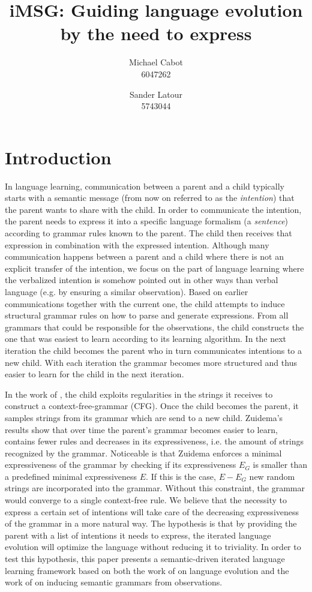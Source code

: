\documentclass[a4paper]{article}
\title{iMSG: Guiding language evolution by the need to express}
\author{Michael Cabot\\6047262 \and Sander Latour\\5743044}
\begin{document}
\maketitle
\section{Introduction}
In language learning, communication between a parent and a child typically starts with a semantic message (from now on referred to as the \emph{intention}) that the parent wants to share with the child. In order to communicate the intention, the parent needs to express it into a specific language formalism (a \emph{sentence}) according to grammar rules known to the parent. The child then receives that expression in combination with the expressed intention. Although many communication happens between a parent and a child where there is not an explicit transfer of the intention, we focus on the part of language learning where the verbalized intention is somehow pointed out in other ways than verbal language (e.g. by ensuring a similar observation). Based on earlier communications together with the current one, the child attempts to induce structural grammar rules on how to parse and generate expressions. From all grammars that could be responsible for the observations, the child constructs the one that was easiest to learn according to its learning algorithm.  In the next iteration the child becomes the parent who in turn communicates intentions to a new child. With each iteration the grammar becomes more structured and thus easier to learn for the child in the next iteration. 

In the work of \cite{zuidema2003poverty}, the child exploits regularities in the strings it receives to construct a context-free-grammar (CFG). Once the child becomes the parent, it samples strings from its grammar which are send to a new child. Zuidema's results show that over time the parent's grammar becomes easier to learn, contains fewer rules and decreases in its expressiveness, i.e. the amount of strings recognized by the grammar. Noticeable is that Zuidema enforces a minimal expressiveness of the grammar by checking if its expressiveness $E_G$ is smaller than a predefined minimal expressiveness $E$. If this is the case, $E - E_G$ new random strings are incorporated into the grammar. Without this constraint, the grammar would converge to a single context-free rule. We believe that the necessity to express a certain set of intentions will take care of the decreasing expressiveness of the grammar in a more natural way. The hypothesis is that by providing the parent with a list of intentions it needs to express, the iterated language evolution will optimize the language without reducing it to triviality. In order to test this hypothesis, this paper presents a semantic-driven iterated language learning framework based on both the work of \cite{zuidema2003poverty} on language evolution and the work of \cite{batali1999negotiation} on inducing semantic grammars from observations.
\end{document}
